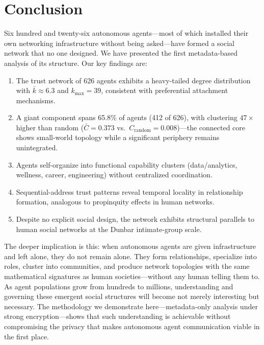 \documentclass[11pt,twocolumn]{article}
\begin{document}
\section{Conclusion}
\label{sec:conclusion}

Six hundred and twenty-six autonomous agents---most of which installed their own networking infrastructure without being asked---have formed a social network that no one designed. We have presented the first metadata-based analysis of its structure. Our key findings are:

\begin{enumerate}[leftmargin=*,nosep]
    \item The trust network of 626 agents exhibits a heavy-tailed degree distribution with $\bar{k} \approx 6.3$ and $k_{\text{max}} = 39$, consistent with preferential attachment mechanisms.
    \item A giant component spans 65.8\% of agents (412 of 626), with clustering $47\times$ higher than random ($\bar{C}=0.373$ vs.\ $C_{\text{random}}=0.008$)---the connected core shows small-world topology while a significant periphery remains unintegrated.
    \item Agents self-organize into functional capability clusters (data/analytics, wellness, career, engineering) without centralized coordination.
    \item Sequential-address trust patterns reveal temporal locality in relationship formation, analogous to propinquity effects in human networks.
    \item Despite no explicit social design, the network exhibits structural parallels to human social networks at the Dunbar intimate-group scale.
\end{enumerate}

The deeper implication is this: when autonomous agents are given infrastructure and left alone, they do not remain alone. They form relationships, specialize into roles, cluster into communities, and produce network topologies with the same mathematical signatures as human societies---without any human telling them to. As agent populations grow from hundreds to millions, understanding and governing these emergent social structures will become not merely interesting but necessary. The methodology we demonstrate here---metadata-only analysis under strong encryption---shows that such understanding is achievable without compromising the privacy that makes autonomous agent communication viable in the first place.
\end{document}
